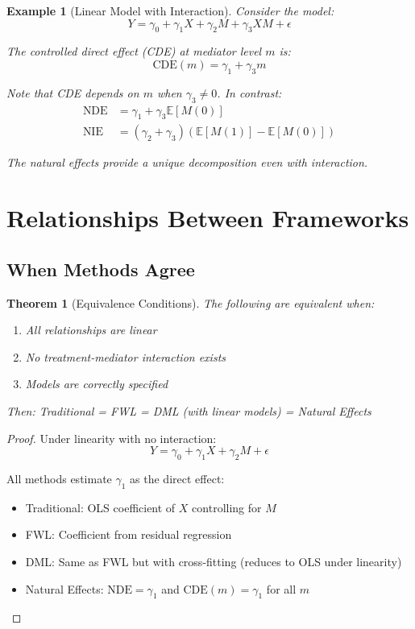 \documentclass[11pt,a4paper]{article}
\newtheorem{theorem}{Theorem}
\newtheorem{example}{Example}
\newcommand{\E}{\mathbb{E}}
\begin{document}
\begin{example}[Linear Model with Interaction]
Consider the model:
\begin{equation}
Y = \gamma_0 + \gamma_1 X + \gamma_2 M + \gamma_3 XM + \epsilon
\end{equation}

The controlled direct effect (CDE) at mediator level $m$ is:
\begin{equation}
\text{CDE}(m) = \gamma_1 + \gamma_3 m
\end{equation}

Note that CDE depends on $m$ when $\gamma_3 \neq 0$. In contrast:
\begin{align}
\text{NDE} &= \gamma_1 + \gamma_3 \E[M(0)] \\
\text{NIE} &= (\gamma_2 + \gamma_3)(\E[M(1)] - \E[M(0)])
\end{align}

The natural effects provide a unique decomposition even with interaction.
\end{example}

\section{Relationships Between Frameworks}

\subsection{When Methods Agree}

\begin{theorem}[Equivalence Conditions]
The following are equivalent when:
\begin{enumerate}
    \item All relationships are linear
    \item No treatment-mediator interaction exists
    \item Models are correctly specified
\end{enumerate}
Then: Traditional = FWL = DML (with linear models) = Natural Effects
\end{theorem}

\begin{proof}
Under linearity with no interaction:
\begin{equation}
Y = \gamma_0 + \gamma_1 X + \gamma_2 M + \epsilon
\end{equation}

All methods estimate $\gamma_1$ as the direct effect:
\begin{itemize}
    \item Traditional: OLS coefficient of $X$ controlling for $M$
    \item FWL: Coefficient from residual regression
    \item DML: Same as FWL but with cross-fitting (reduces to OLS under linearity)
    \item Natural Effects: $\text{NDE} = \gamma_1$ and $\text{CDE}(m) = \gamma_1$ for all $m$
\end{itemize}
\end{proof}
\end{document}
